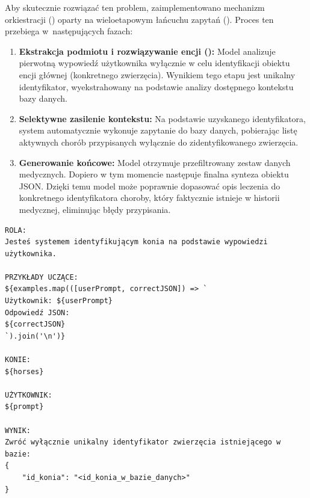 Aby skutecznie rozwiązać ten problem, zaimplementowano mechanizm orkiestracji () oparty na wieloetapowym łańcuchu zapytań (). Proces ten przebiega w~następujących fazach:
\begin{enumerate}
    \item \textbf{Ekstrakcja podmiotu i rozwiązywanie encji ():} Model analizuje pierwotną wypowiedź użytkownika wyłącznie w celu identyfikacji obiektu encji głównej (konkretnego zwierzęcia). Wynikiem tego etapu jest unikalny identyfikator, wyekstrahowany na podstawie analizy dostępnego kontekstu bazy danych.
    \item \textbf{Selektywne zasilenie kontekstu:} Na podstawie uzyskanego identyfikatora, system automatycznie wykonuje zapytanie do bazy danych, pobierając listę aktywnych chorób przypisanych wyłącznie do zidentyfikowanego zwierzęcia.
    \item \textbf{Generowanie końcowe:} Model otrzymuje przefiltrowany zestaw danych medycznych. Dopiero w tym momencie następuje finalna synteza obiektu JSON. Dzięki temu model może poprawnie dopasować opis leczenia do konkretnego identyfikatora choroby, który faktycznie istnieje w historii medycznej, eliminując błędy przypisania.
\end{enumerate}

\begin{lstlisting}[caption={Pierwsze zapytanie w procesie orkiestracji: ekstrakcja identyfikatora konia.}, label={wyk:leczenie_chaining_faza1}]
ROLA:
Jesteś systemem identyfikującym konia na podstawie wypowiedzi użytkownika.

PRZYKŁADY UCZĄCE:
${examples.map(([userPrompt, correctJSON]) => `
Użytkownik: ${userPrompt}
Odpowiedź JSON:
${correctJSON}
`).join('\n')}

KONIE: 
${horses}

UŻYTKOWNIK:
${prompt}

WYNIK:
Zwróć wyłącznie unikalny identyfikator zwierzęcia istniejącego w bazie:
{
    "id_konia": "<id_konia_w_bazie_danych>"
}
\end{lstlisting}


